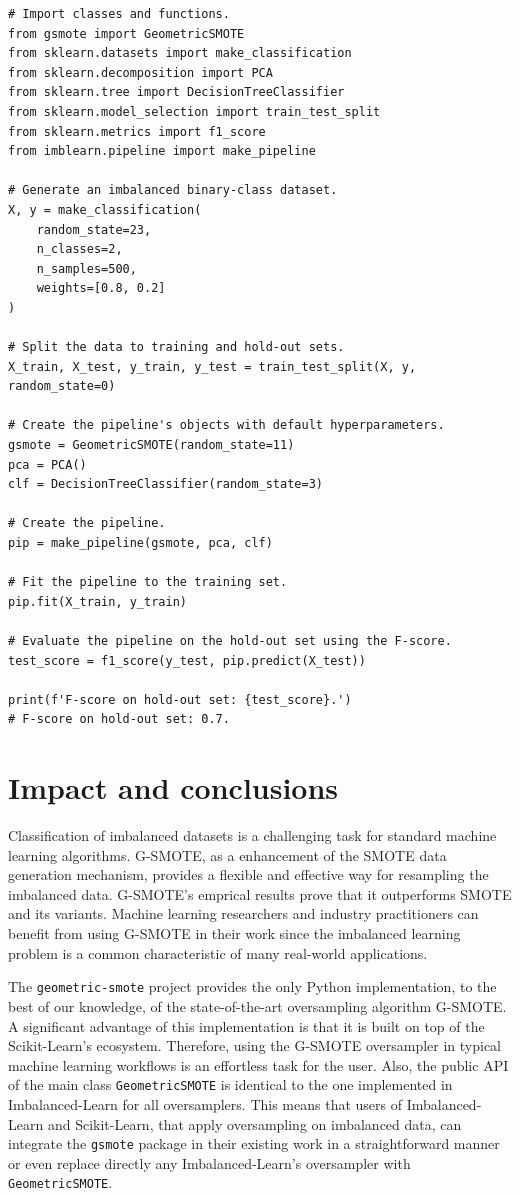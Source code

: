 \documentclass[preprint,12pt, a4paper]{elsarticle}
\begin{document}
\begin{lstlisting}[caption={Training and evaluation of a machine learning pipeline that contains the \texttt{GeometricSMOTE} object.},label={lst:pipeline}]
# Import classes and functions.
from gsmote import GeometricSMOTE
from sklearn.datasets import make_classification
from sklearn.decomposition import PCA
from sklearn.tree import DecisionTreeClassifier
from sklearn.model_selection import train_test_split
from sklearn.metrics import f1_score
from imblearn.pipeline import make_pipeline

# Generate an imbalanced binary-class dataset.
X, y = make_classification(
	random_state=23, 
	n_classes=2, 
	n_samples=500,
	weights=[0.8, 0.2]
)

# Split the data to training and hold-out sets.
X_train, X_test, y_train, y_test = train_test_split(X, y, random_state=0)

# Create the pipeline's objects with default hyperparameters.
gsmote = GeometricSMOTE(random_state=11)
pca = PCA()
clf = DecisionTreeClassifier(random_state=3)

# Create the pipeline.
pip = make_pipeline(gsmote, pca, clf)

# Fit the pipeline to the training set.
pip.fit(X_train, y_train)

# Evaluate the pipeline on the hold-out set using the F-score.
test_score = f1_score(y_test, pip.predict(X_test))

print(f'F-score on hold-out set: {test_score}.')
# F-score on hold-out set: 0.7.
\end{lstlisting}

\section{Impact and conclusions}

Classification of imbalanced datasets is a challenging task for standard machine learning algorithms. G-SMOTE, as a enhancement of the SMOTE data generation mechanism, provides a flexible and effective way for resampling the imbalanced data. G-SMOTE's emprical results prove that it outperforms SMOTE and its variants. Machine learning researchers and industry practitioners can benefit from using G-SMOTE in their work since the imbalanced learning problem is a common characteristic of many real-world applications.

The \texttt{geometric-smote} project provides the only Python implementation, to the best of our knowledge, of the state-of-the-art oversampling algorithm G-SMOTE. A significant advantage of this implementation is that it is built on top of the Scikit-Learn's ecosystem. Therefore, using the G-SMOTE oversampler in typical machine learning workflows is an effortless task for the user. Also, the public API of the main class \texttt{GeometricSMOTE} is identical to the one implemented in Imbalanced-Learn for all oversamplers. This means that users of Imbalanced-Learn and Scikit-Learn, that apply oversampling on imbalanced data, can integrate the \texttt{gsmote} package in their existing work in a straightforward manner or even replace directly any Imbalanced-Learn's oversampler with \texttt{GeometricSMOTE}.
\end{document}
